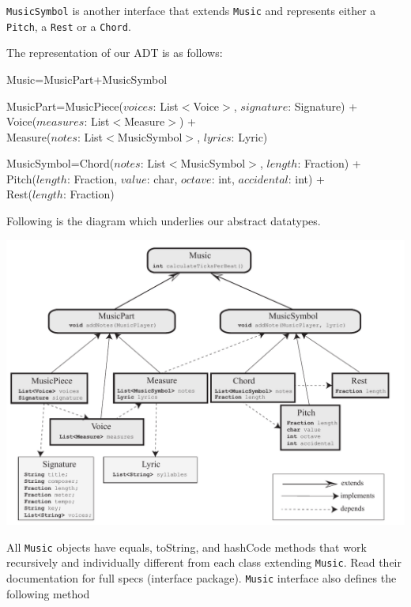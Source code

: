 \documentclass[12pt]{book}
\begin{document}
 {\tt MusicSymbol} is another interface that extends {\tt Music} and represents  either a {\tt Pitch}, a {\tt Rest} or a {\tt Chord}.

The representation of our ADT is as follows:


\bigskip
\noindent  Music=MusicPart+MusicSymbol
\medskip

      \noindent MusicPart=MusicPiece($voices$: List$<$Voice$>$, $signature$: Signature) +
 \\ \phantom{MusicPart=}Voice($measures$: List$<$Measure$>$) +
 \\ \phantom{MusicPart=}Measure($notes$: List$<$MusicSymbol$>$, $lyrics$: Lyric)

\medskip

      \noindent MusicSymbol=Chord($notes$: List$<$MusicSymbol$>$, $length$: Fraction) +
 \\ \phantom{MusicSymbol=}Pitch($length$: Fraction, $value$: char, $octave$: int, $accidental$: int) +
 \\ \phantom{MusicSymbol=}Rest($length$: Fraction)

\medskip

\newpage


Following is the diagram which underlies our abstract datatypes. 

\centerline{ \includegraphics{Music_revised.pdf}}

\noindent\makebox[\linewidth]{\rule{\textwidth}{0.4pt}}

All {\tt Music} objects have equals, toString, and hashCode methods  that work recursively and individually different from each class extending {\tt Music}. Read their documentation for full specs (interface package).
{\tt Music} interface also defines the following method
\end{document}
